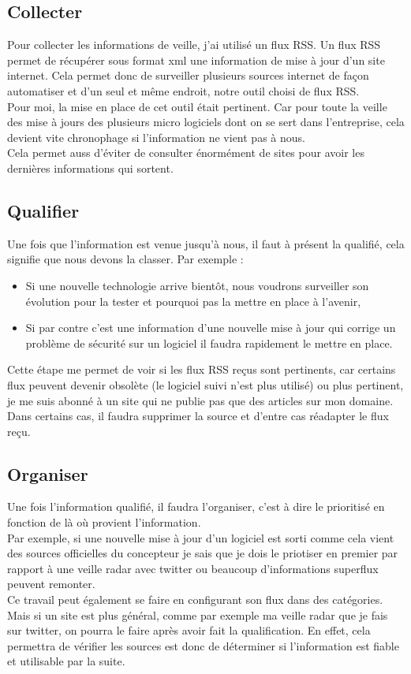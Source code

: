 \documentclass[11pt,a4paper,oneside]{book}
\begin{document}
\subsection{Collecter}

Pour collecter les informations de veille, j'ai utilisé un flux RSS.
Un flux RSS permet de récupérer sous format xml une information de mise à jour d'un site internet. Cela permet donc de surveiller plusieurs sources internet de façon automatiser et d'un seul et même endroit, notre outil choisi de flux RSS. \\
Pour moi, la mise en place de cet outil était pertinent. Car pour toute la veille des mise à jours des plusieurs micro logiciels dont on se sert dans l'entreprise, cela devient vite chronophage si l'information ne vient pas à nous. \\
Cela permet auss d'éviter de consulter énormément de sites pour avoir les dernières informations qui sortent.

\subsection{Qualifier}

Une fois que l'information est venue jusqu'à nous, il faut à présent la qualifié, cela signifie que nous devons la classer.
Par exemple :
\begin{itemize}
\item Si une nouvelle technologie arrive bientôt, nous voudrons surveiller son évolution pour la tester et pourquoi pas la mettre en place à l'avenir,
\item Si par contre c'est une information d'une nouvelle mise à jour qui corrige un problème de  sécurité sur un logiciel il faudra rapidement le mettre en place.
\end{itemize}
Cette étape me permet de voir si les flux RSS reçus sont pertinents, car certains flux peuvent devenir obsolète (le logiciel suivi n'est plus utilisé) ou plus pertinent, je me suis abonné à un site qui ne publie pas que des articles sur mon domaine. \\
Dans certains cas, il faudra supprimer la source et d'entre cas réadapter le flux reçu.

\subsection{Organiser}

Une fois l'information qualifié, il faudra l'organiser, c'est à dire le prioritisé en fonction de là où provient l'information. \\
Par exemple, si une nouvelle mise à jour d'un logiciel est sorti comme cela vient des sources officielles du concepteur je sais que je dois le priotiser en premier par rapport à une veille radar avec twitter ou beaucoup d'informations superflux peuvent remonter. \\
Ce travail peut également se faire en configurant son flux dans des catégories.
Mais si un site est plus général, comme par exemple ma veille radar que je fais sur twitter, on pourra le faire après avoir fait la qualification.
En effet, cela permettra de vérifier les sources est donc de déterminer si l'information est fiable et utilisable par la suite.
\end{document}

